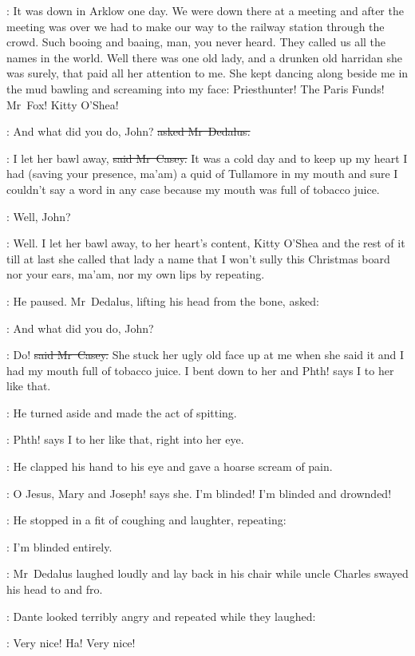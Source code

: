 \casey:
It was down in Arklow one day.
We were down there at a meeting
and after the meeting was over
we had to make our way to the railway station through the crowd.
Such booing and baaing, man, you never heard.
They called us all the names in the world.
Well there was one old lady,
and a drunken old harridan she was surely,
that paid all her attention to me.
She kept dancing along beside me in the mud
bawling and screaming into my face:
Priesthunter!
The Paris Funds!
Mr~Fox!
Kitty O’Shea!

\simon:
And what did you do, John?
\sout{asked Mr~Dedalus.}

\casey:
I let her bawl away,
\sout{said Mr~Casey.}
It was a cold day
and to keep up my heart I had
(saving your presence, ma’am)
a quid of Tullamore in my mouth
and sure I couldn’t say a word in any case
because my mouth was full of tobacco juice.

\simon:
Well, John?

\casey:
Well.
I let her bawl away,
to her heart’s content,
Kitty O’Shea and the rest of it
till at last she called that lady
a name that I won’t sully this Christmas board
nor your ears, ma’am,
nor my own lips
by repeating.

:
He paused.
Mr~Dedalus,
lifting his head from the bone,
asked:

\simon:
And what did you do, John?

\casey:
Do!
\sout{said Mr~Casey.}
She stuck her ugly old face up at me
when she said it
and I had my mouth full of tobacco juice.
I bent down to her
and Phth!
says I to her
like that.

:
He turned aside
and made the act of spitting.

\casey:
Phth!
says I to her like that,
right into her eye.

:
He clapped his hand to his eye
and gave a hoarse scream of pain.

\casey:
O Jesus, Mary and Joseph!
says she.
I’m blinded! I’m blinded and drownded!

:
He stopped in a fit of coughing and laughter,
repeating:

\casey:
I’m blinded entirely.

:
Mr~Dedalus laughed loudly
and lay back in his chair
while uncle Charles swayed his head to and fro.

:
Dante looked terribly angry
and repeated while they laughed:

\dante:
Very nice!
Ha!
Very nice!


